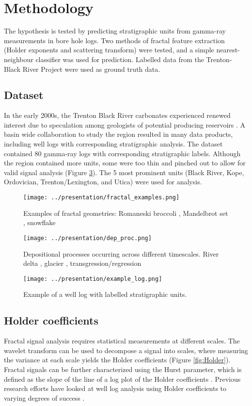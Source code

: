 \documentclass[journal]{IEEEtran}
\begin{document}
\section{Methodology}
The hypothesis is tested by predicting stratigraphic units from gamma-ray measurements in 
bore hole logs. Two methods of fractal feature extraction (Holder exponents and scattering transform) were tested, and a simple 
nearest-neighbour classifier was used for prediction. Labelled data from the Trenton-Black River 
Project were used as ground truth data.

\subsection{Dataset}
In the early 2000s, the Trenton Black River carbonates experienced renewed interest due to 
speculation among geologists of potential producing reservoirs \cite{Trenton}. A basin wide collaboration to 
study the region resulted in many data products, including well logs with corresponding 
stratigraphic analysis. The dataset contained 80 gamma-ray logs with corresponding 
stratigraphic labels. Although the region contained more units, some were too thin and pinched out to allow
for valid signal analysis (Figure \ref{fig:well_log}). The 5 most prominent units (Black River, Kope, Ordovician, Trenton/Lexington,
and Utica) were used for analysis.


 \begin{figure}[!t]
\centering
\texttt{[image: ../presentation/fractal\_examples.png]}
\caption{Examples of fractal geometries: Romaneski broccoli \cite{wired}, Mandelbrot set \cite{wiki}, snowflake \cite{wired}}
\label{fig:fractal_ex}
\end{figure}

 \begin{figure}[!t]
\centering
\texttt{[image: ../presentation/dep\_proc.png]}
\caption{Depositional processes occurring across different timescales. River delta \cite{wiki}, glacier \cite{glacier}, transgression/regression \cite{transgression}}
\label{fig:dep_proc}
\end{figure}

 \begin{figure}[!t]
\centering
\texttt{[image: ../presentation/example\_log.png]}
\caption{Example of a well log with labelled stratigraphic units.}
\label{fig:well_log}
\end{figure}

\subsection{Holder coefficients}
Fractal signal analysis requires statistical measurements at different scales. The wavelet transform can
be used to decompose a signal into scales, where measuring the variance at each scale yields the
Holder coefficients (Figure \ref{fig:Holder}). Fractal signals can be further characterized using the Hurst parameter, 
which is defined as the slope of the line of a log plot of the Holder coefficients \cite{Aliouane}. Previous research
efforts have looked at well log analysis using Holder coefficients to varying degrees of success \cite{Aliouane} \cite{herrmann} \cite{Salehi}.
\end{document}
